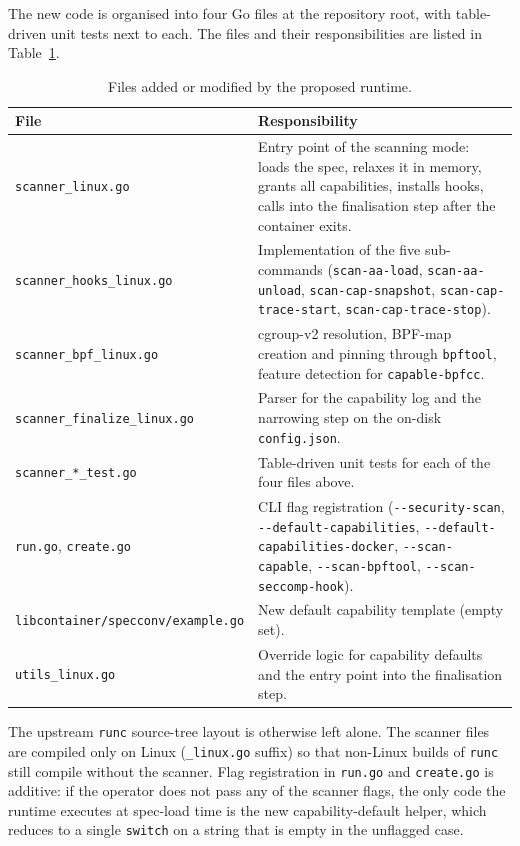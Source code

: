 The new code is organised into four Go files at the repository root, with table-driven unit tests next to each. The files and their responsibilities are listed in Table~\ref{tab:sourcechanges}.

\begin{table}[ht]
\centering
\caption{Files added or modified by the proposed runtime.}
\label{tab:sourcechanges}
\begin{tabular}{p{4.8cm}p{9.4cm}}
\toprule
\textbf{File} & \textbf{Responsibility} \\
\midrule
\texttt{scanner\_linux.go} & Entry point of the scanning mode: loads the spec, relaxes it in memory, grants all capabilities, installs hooks, calls into the finalisation step after the container exits. \\
\texttt{scanner\_hooks\_linux.go} & Implementation of the five sub-commands (\texttt{scan-aa-load}, \texttt{scan-aa-unload}, \texttt{scan-cap-snapshot}, \texttt{scan-cap-trace-start}, \texttt{scan-cap-trace-stop}). \\
\texttt{scanner\_bpf\_linux.go} & cgroup-v2 resolution, BPF-map creation and pinning through \texttt{bpftool}, feature detection for \texttt{capable-bpfcc}. \\
\texttt{scanner\_finalize\_linux.go} & Parser for the capability log and the narrowing step on the on-disk \texttt{config.json}. \\
\texttt{scanner\_*\_test.go} & Table-driven unit tests for each of the four files above. \\
\texttt{run.go}, \texttt{create.go} & CLI flag registration (\texttt{-{}-security-scan}, \texttt{-{}-default-capabilities}, \texttt{-{}-default-capabilities-docker}, \texttt{-{}-scan-capable}, \texttt{-{}-scan-bpftool}, \texttt{-{}-scan-seccomp-hook}). \\
\texttt{libcontainer/specconv/example.go} & New default capability template (empty set). \\
\texttt{utils\_linux.go} & Override logic for capability defaults and the entry point into the finalisation step. \\
\bottomrule
\end{tabular}
\end{table}

The upstream \texttt{runc} source-tree layout is otherwise left alone. The scanner files are compiled only on Linux (\texttt{\_linux.go} suffix) so that non-Linux builds of \texttt{runc} still compile without the scanner. Flag registration in \texttt{run.go} and \texttt{create.go} is additive: if the operator does not pass any of the scanner flags, the only code the runtime executes at spec-load time is the new capability-default helper, which reduces to a single \texttt{switch} on a string that is empty in the unflagged case.

